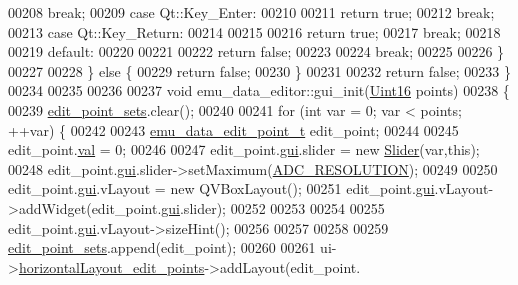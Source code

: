 \begin{DoxyCode}
00208                 \textcolor{keywordflow}{break};
00209             \textcolor{keywordflow}{case} Qt::Key\_Enter:
00210 
00211                  \textcolor{keywordflow}{return} \textcolor{keyword}{true};
00212                 \textcolor{keywordflow}{break};
00213             \textcolor{keywordflow}{case} Qt::Key\_Return:
00214 
00215 
00216                  \textcolor{keywordflow}{return} \textcolor{keyword}{true};
00217                 \textcolor{keywordflow}{break};
00218 
00219             \textcolor{keywordflow}{default}:
00220 
00221 
00222                 \textcolor{keywordflow}{return} \textcolor{keyword}{false};
00223 
00224                \textcolor{keywordflow}{break};
00225 
00226             \}
00227 
00228         \} \textcolor{keywordflow}{else} \{
00229             \textcolor{keywordflow}{return} \textcolor{keyword}{false};
00230         \}
00231 
00232         \textcolor{keywordflow}{return} \textcolor{keyword}{false};
00233 \}
00234 
00235 
00236 
00237 \textcolor{keywordtype}{void} emu\_data\_editor::gui\_init(\hyperlink{a00001_aae7407b021d43f7193a81a58cfb3e297}{Uint16} points)
00238 \{
00239           \hyperlink{a00004_ab093b86d07b4eb96c36878089a7d97df}{edit\_point\_sets}.clear();
00240 
00241           \textcolor{keywordflow}{for} (\textcolor{keywordtype}{int} var = 0; var < points; ++var) \{
00242 
00243            \hyperlink{a00001_dc/ddf/a00067}{emu\_data\_edit\_point\_t} edit\_point;
00244 
00245            edit\_point.\hyperlink{a00001_aaf35f240371007fbceb3387f76ad53a7}{val} = 0;
00246 
00247            edit\_point.\hyperlink{a00001_ad927f72d9047284b972a0aaa5aa94b93}{gui}.slider  = \textcolor{keyword}{new} \hyperlink{a00024}{Slider}(var,\textcolor{keyword}{this});
00248            edit\_point.\hyperlink{a00001_ad927f72d9047284b972a0aaa5aa94b93}{gui}.slider->setMaximum(\hyperlink{a00031_a00978ca9e8220475258dcbbbb7d29129}{ADC\_RESOLUTION});
00249 
00250            edit\_point.\hyperlink{a00001_ad927f72d9047284b972a0aaa5aa94b93}{gui}.vLayout = \textcolor{keyword}{new} QVBoxLayout();
00251            edit\_point.\hyperlink{a00001_ad927f72d9047284b972a0aaa5aa94b93}{gui}.vLayout->addWidget(edit\_point.\hyperlink{a00001_ad927f72d9047284b972a0aaa5aa94b93}{gui}.slider);
00252 
00253 
00254 
00255            edit\_point.\hyperlink{a00001_ad927f72d9047284b972a0aaa5aa94b93}{gui}.vLayout->sizeHint();
00256 
00257 
00258 
00259            \hyperlink{a00004_ab093b86d07b4eb96c36878089a7d97df}{edit\_point\_sets}.append(edit\_point);
00260 
00261            ui->\hyperlink{a00026_ae08b661288ecee049945e4a63d0c0af0}{horizontalLayout\_edit\_points}->addLayout(edit\_point.

\end{DoxyCode}
